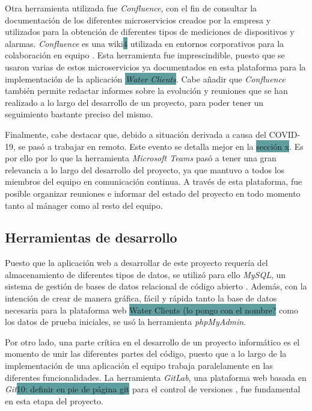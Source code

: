 \documentclass[pdftex,11pt,a4paper]{book}
\begin{document}
Otra herramienta utilizada fue \textit{Confluence}, con el fin de consultar la documentación de los diferentes microservicios creados por la empresa y utilizados para la obtención de diferentes tipos de mediciones de dispositivos y alarmas. \textit{Confluence} es una wiki\colorbox{CadetBlue}{4} utilizada en entornos corporativos para la colaboración en equipo \cite{bib:wiki}. Esta herramienta fue imprescindible, puesto que se usaron varias de estos microservicios ya documentados en esta plataforma para la implementación de la aplicación \colorbox{CadetBlue}{\textit{Water Clients}}. Cabe añadir que \textit{Confluence} también permite redactar informes sobre la evolución y reuniones que se han realizado a lo largo del desarrollo de un proyecto, para poder tener un seguimiento bastante preciso del mismo.

Finalmente, cabe destacar que, debido a situación derivada a causa del COVID-19, se pasó a trabajar en remoto. Este evento se detalla mejor en la \colorbox{CadetBlue}{sección x}. Es por ello por lo que la herramienta \textit{Microsoft Teams} pasó a tener una gran relevancia a lo largo del desarrollo del proyecto, ya que mantuvo a todos los miembros del equipo en comunicación continua. A través de esta plataforma, fue posible organizar reuniones e informar del estado del proyecto en todo momento tanto al mánager como al resto del equipo.

\subsection{Herramientas de desarrollo}

Puesto que la aplicación web a desarrollar de este proyecto requería del almacenamiento de diferentes tipos de datos, se utilizó para ello \textit{MySQL}, un sistema de gestión de bases de datos relacional de código abierto \cite{bib:mysql}. Además, con la intención de crear de manera gráfica, fácil y rápida tanto la base de datos necesaria para la plataforma web \colorbox{CadetBlue}{Water Clients (lo pongo con el nombre?}  como los datos de prueba iniciales, se usó la herramienta \textit{phpMyAdmin}.

Por otro lado, una parte crítica en el desarrollo de un proyecto informático es el momento de unir las diferentes partes del código, puesto que a lo largo de la implementación de una aplicación el equipo trabaja paralelamente en las diferentes funcionalidades. La herramienta \textit{GitLab}, una plataforma web basada en \textit{Git}\colorbox{CadetBlue}{10: definir en pie de página git} para el control de versiones \cite{bib:gitlab}, fue fundamental en esta etapa del proyecto.
\end{document}
